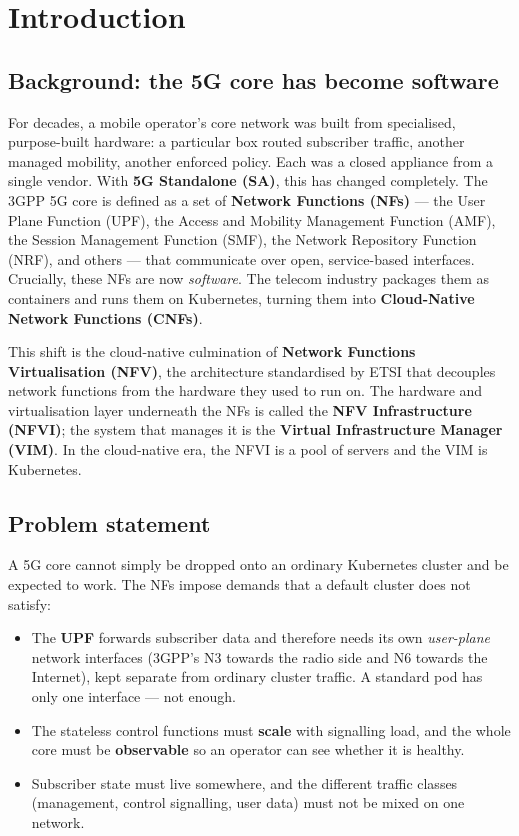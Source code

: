 \section{Introduction}

\subsection{Background: the 5G core has become software}

For decades, a mobile operator's core network was built from specialised,
purpose-built hardware: a particular box routed subscriber traffic, another
managed mobility, another enforced policy. Each was a closed appliance from a
single vendor. With \textbf{5G Standalone (SA)}, this has changed completely.
The 3GPP 5G core \cite{ts23501} is defined as a set of \textbf{Network
Functions (NFs)} --- the User Plane Function (UPF), the Access and Mobility
Management Function (AMF), the Session Management Function (SMF), the Network
Repository Function (NRF), and others --- that communicate over open,
service-based interfaces. Crucially, these NFs are now \emph{software}. The
telecom industry packages them as containers and runs them on Kubernetes,
turning them into \textbf{Cloud-Native Network Functions (CNFs)}.

This shift is the cloud-native culmination of \textbf{Network Functions
Virtualisation (NFV)}, the architecture standardised by ETSI \cite{etsi002}
that decouples network functions from the hardware they used to run on. The
hardware and virtualisation layer underneath the NFs is called the
\textbf{NFV Infrastructure (NFVI)}; the system that manages it is the
\textbf{Virtual Infrastructure Manager (VIM)}. In the cloud-native era, the
NFVI is a pool of servers and the VIM is Kubernetes.

\subsection{Problem statement}

A 5G core cannot simply be dropped onto an ordinary Kubernetes cluster and be
expected to work. The NFs impose demands that a default cluster does not
satisfy:

\begin{itemize}
    \item The \textbf{UPF} forwards subscriber data and therefore needs its
          own \emph{user-plane} network interfaces (3GPP's N3 towards the
          radio side and N6 towards the Internet), kept separate from ordinary
          cluster traffic. A standard pod has only one interface --- not
          enough.
    \item The stateless control functions must \textbf{scale} with signalling
          load, and the whole core must be \textbf{observable} so an operator
          can see whether it is healthy.
    \item Subscriber state must live somewhere, and the different traffic
          classes (management, control signalling, user data) must not be
          mixed on one network.
\end{itemize}

